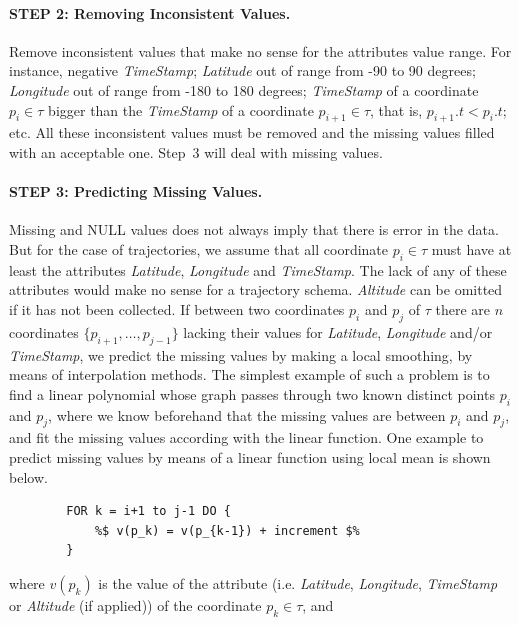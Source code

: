 \documentclass[a4paper,12pt]{article}
\begin{document}
\paragraph{STEP 2: Removing Inconsistent Values.}
Remove inconsistent values that make no sense for the attributes value range. For instance, negative \textit{TimeStamp}; \textit{Latitude} out of range from -90 to 90 degrees; \textit{Longitude} out of range from -180 to 180 degrees; \textit{TimeStamp} of a coordinate $p_i \in \tau$ bigger than the \textit{TimeStamp} of a coordinate $p_{i+1} \in \tau$, that is, $p_{i+1}.t < p_i.t$; etc. All these inconsistent values must be removed and the missing values filled with an acceptable one. Step~3 will deal with missing values.

\paragraph{STEP 3: Predicting Missing Values.}
Missing and NULL values does not always imply that there is error in the data. But for the case of trajectories, we assume that all coordinate $p_i \in \tau$ must have at least the attributes \textit{Latitude}, \textit{Longitude} and \textit{TimeStamp}. The lack of any of these attributes would make no sense for a trajectory schema. \textit{Altitude} can be omitted if it has not been collected. If between two coordinates $p_i$ and $p_j$ of $\tau$ there are $n$ coordinates $\{p_{i+1}, \dots, p_{j-1}\}$ lacking their values for \textit{Latitude}, \textit{Longitude} and/or \textit{TimeStamp}, we predict the missing values by making a local smoothing, by means of interpolation methods. The simplest example of such a problem is to find a linear polynomial whose graph passes through two known distinct points $p_i$ and $p_j$, where we know beforehand that the missing values are between $p_i$ and $p_j$, and fit the missing values according with the linear function. One example to predict missing values by means of a linear function using local mean is shown below.

\begin{center}
\begin{lstlisting}
		FOR k = i+1 to j-1 DO {
			%$ v(p_k) = v(p_{k-1}) + increment $%
		}
\end{lstlisting}
\end{center}

where $v(p_k)$ is the value of the attribute (i.e. \textit{Latitude}, \textit{Longitude}, \textit{TimeStamp} or \textit{Altitude} (if applied)) of the coordinate $p_k \in \tau$, and 
\end{document}

